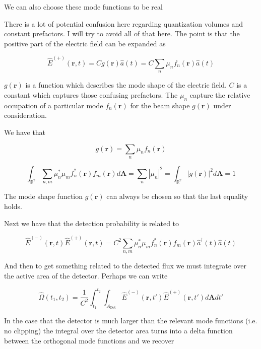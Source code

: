 \documentclass[12pt]{article}
\newcommand{\bv}[1]{\textbf{#1}}
\begin{document}
We can also choose these mode functions to be real

There is a lot of potential confusion here regarding quantization volumes and constant prefactors. I will try to avoid all of that here. The point is that the positive part of the electric field can be expanded as

\begin{equation}
\hat{E}^{(+)}(\bv{r},t) = C g(\bv{r}) \hat{a}(t) = C \sum_{n} \mu_n f_n(\bv{r}) \hat{a}(t)
\end{equation}

$g(\bv{r})$ is a function which describes the mode shape of the electric field. $C$ is a constant which captures those confusing prefactors. The $\mu_n$ capture the relative occupation of a particular mode $f_n(\bv{r})$ for the beam shape $g(\bv{r})$ under consideration.

We have that

\begin{equation}
g(\bv{r}) = \sum_n \mu_n f_n(\bv{r})
\end{equation}

\begin{equation}
\int_{\mathbb{R}^2} \sum_{n,m} \mu_n^*\mu_m f_n^*(\bv{r})f_m(\bv{r}) d\bv{A} = \sum_n |\mu_n|^2 = \int_{\mathbb{R}^2}|g(\bv{r})|^2d\bv{A} = 1
\end{equation}

The mode shape function $g(\bv{r})$ can always be chosen so that the last equality holds.


Next we have that the detection probability is related to 

\begin{equation}
\hat{E}^{(-)}(\bv{r},t)\hat{E}^{(+)}(\bv{r},t) = C^2 \sum_{n,m} \mu_n^* \mu_m f^*_n(\bv{r})f_m(\bv{r}) \hat{a}^{\dag}(t)\hat{a}(t)
\end{equation}

And then to get something related to the detected flux we must integrate over the active area of the detector. Perhaps we can write

\begin{equation}
\hat{\Omega}(t_1,t_2) = \frac{1}{C^2} \int_{t_1}^{t_2}\int_{A_{\text{Det}}} \hat{E}^{(-)}(\bv{r},t')\hat{E}^{(+)}(\bv{r},t') d\bv{A} dt'
\end{equation}

In the case that the detector is much larger than the relevant mode functions (i.e. no clipping) the integral over the detector area turns into a delta function between the orthogonal mode functions and we recover
\end{document}
